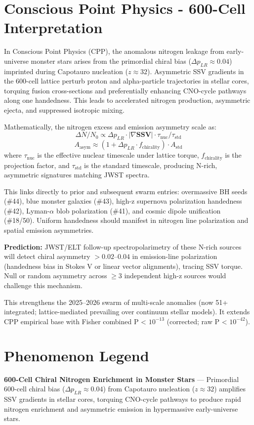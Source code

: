 \documentclass[11pt]{article}
\begin{document}
\section{Conscious Point Physics - 600-Cell Interpretation}
In Conscious Point Physics (CPP), the anomalous nitrogen leakage from early-universe monster stars arises from the primordial chiral bias ($\Delta p_{LR} \approx 0.04$) imprinted during Capotauro nucleation ($z \approx 32$). Asymmetric SSV gradients in the 600-cell lattice perturb proton and alpha-particle trajectories in stellar cores, torquing fusion cross-sections and preferentially enhancing CNO-cycle pathways along one handedness. This leads to accelerated nitrogen production, asymmetric ejecta, and suppressed isotropic mixing.

Mathematically, the nitrogen excess and emission asymmetry scale as:  
\[
\Delta N / N_0 \propto \Delta p_{LR} \cdot |\nabla \mathbf{SSV}| \cdot \tau_{\text{nuc}} / \tau_{\text{std}}
\]  
\[
A_{\text{asym}} \approx (1 + \Delta p_{LR} \cdot f_{\text{chirality}}) \cdot A_{\text{std}}
\]  
where $\tau_{\text{nuc}}$ is the effective nuclear timescale under lattice torque, $f_{\text{chirality}}$ is the projection factor, and $\tau_{\text{std}}$ is the standard timescale, producing N-rich, asymmetric signatures matching JWST spectra.

This links directly to prior and subsequent swarm entries: overmassive BH seeds (\#44), blue monster galaxies (\#43), high-z supernova polarization handedness (\#42), Lyman-$\alpha$ blob polarization (\#41), and cosmic dipole unification (\#18/50). Uniform handedness should manifest in nitrogen line polarization and spatial emission asymmetries.

\textbf{Prediction:} JWST/ELT follow-up spectropolarimetry of these N-rich sources will detect chiral asymmetry $> 0.02$--$0.04$ in emission-line polarization (handedness bias in Stokes V or linear vector alignments), tracing SSV torque. Null or random asymmetry across $\geq 3$ independent high-z sources would challenge this mechanism.

This strengthens the 2025--2026 swarm of multi-scale anomalies (now 51+ integrated; lattice-mediated prevailing over continuum stellar models). It extends CPP empirical base with Fisher combined P < $10^{-13}$ (corrected; raw P < $10^{-42}$).

\section{Phenomenon Legend}
\textbf{600-Cell Chiral Nitrogen Enrichment in Monster Stars} — Primordial 600-cell chiral bias ($\Delta p_{LR} \approx 0.04$) from Capotauro nucleation ($z \approx 32$) amplifies SSV gradients in stellar cores, torquing CNO-cycle pathways to produce rapid nitrogen enrichment and asymmetric emission in hypermassive early-universe stars.
\end{document}
